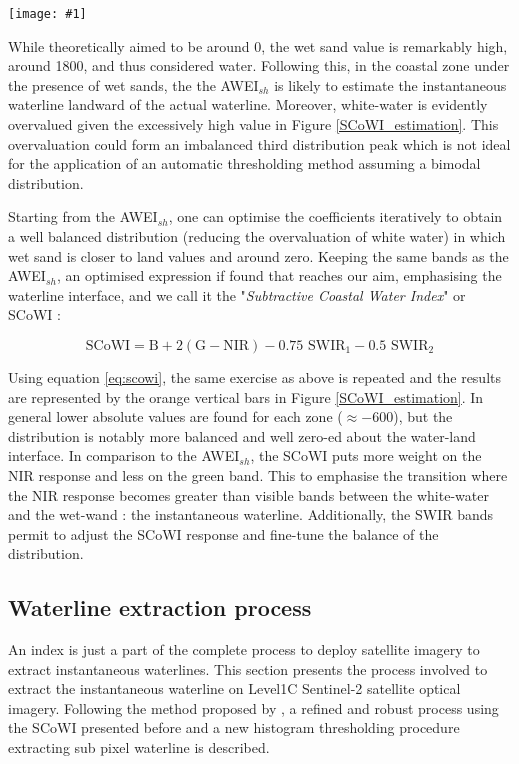 \documentclass[remotesensing,article,submit,pdftex,moreauthors]{Definitions/mdpi}
\newcommand{\myfigure}[4]{
    \begin{figure*}[ht!]
        \centering
        \texttt{[image: \#1]}	 
        \caption{\itshape#2}
        \label{#3}
    \end{figure*} 
}
\begin{document}
\myfigure{img/SCoWI_optimisation.png}{Comparison of the estimated values of the SCoWI (orange bars) against the AWEI$_{sh}$ (blue bars) over the 5 areas of the intertidal zone. The SCoWI has lower estimated values than AWEI$_{sh}$ on the white-water and wet sand area, optimising the extraction of the waterline.}{SCoWI_estimation}{0.5}

While theoretically aimed to be around 0, the wet sand value is remarkably high, around 1800, and thus considered water. Following this, in the coastal zone under the presence of wet sands, the the AWEI$_{sh}$ is likely to estimate the instantaneous waterline landward of the actual waterline. Moreover, white-water is evidently overvalued given the excessively high value in Figure \ref{SCoWI_estimation}. This overvaluation could form an imbalanced third distribution peak which is not ideal for the application of an automatic thresholding method assuming a bimodal distribution.

Starting from the AWEI$_{sh}$, one can optimise the coefficients iteratively to obtain a well balanced distribution (reducing the overvaluation of white water) in which wet sand is closer to land values and around zero. Keeping the same bands as the AWEI$_{sh}$, an optimised expression if found that reaches our aim, emphasising the waterline interface, and we call it the "\textit{Subtractive Coastal Water Index}" or SCoWI : 

\begin{equation}
    \textrm{SCoWI} = \textrm{B} + 2(\textrm{G} - \textrm{NIR}) - 0.75 \textrm{ SWIR$_{1}$} - 0.5 \textrm{ SWIR$_{2}$}
    \label{eq:scowi}
\end{equation}

Using equation \ref{eq:scowi}, the same exercise as above is repeated and the results are represented by the orange vertical bars in Figure \ref{SCoWI_estimation}. In general lower absolute values are found for each zone ($\approx -600$), but the distribution is notably more balanced and well zero-ed about the water-land interface. In comparison to the AWEI$_{sh}$, the SCoWI puts more weight on the NIR response and less on the green band. This to emphasise the transition where the NIR response becomes greater than visible bands between the white-water and the wet-wand : the instantaneous waterline. Additionally, the SWIR bands permit to adjust the SCoWI response and fine-tune the balance of the distribution.
        
\subsection{Waterline extraction process}\label{extract_process}
An index is just a part of the complete process to deploy satellite imagery to extract instantaneous waterlines. This section presents the process involved to extract the instantaneous waterline on Level1C Sentinel-2 satellite optical imagery. Following the method proposed by \citep{Bishop_sub_pixel}, a refined and robust process using the SCoWI presented before and a new histogram thresholding procedure extracting sub pixel waterline is described.
\end{document}
